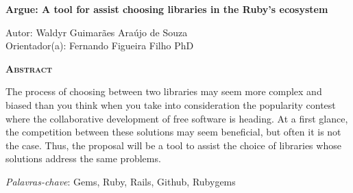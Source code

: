 \begin{center}
	{\Large{\textbf{Argue: A tool for assist choosing libraries in the Ruby's ecosystem}}}
\end{center}

\vspace{1cm}

\begin{flushright}
	Autor: Waldyr Guimarães Araújo de Souza\\
	Orientador(a): Fernando Figueira Filho PhD
\end{flushright}

\vspace{1cm}

\begin{center}
	\Large{\textsc{\textbf{Abstract}}}
\end{center}

\noindent The process of choosing between two libraries may seem more complex and biased than you think when you take into consideration the popularity contest where the collaborative development of free software is heading. At a first glance, the competition between these solutions may seem beneficial, but often it is not the case. Thus, the proposal will be a tool to assist the choice of libraries whose solutions address the same problems.

\noindent\textit{Palavras-chave}: Gems, Ruby, Rails, Github, Rubygems